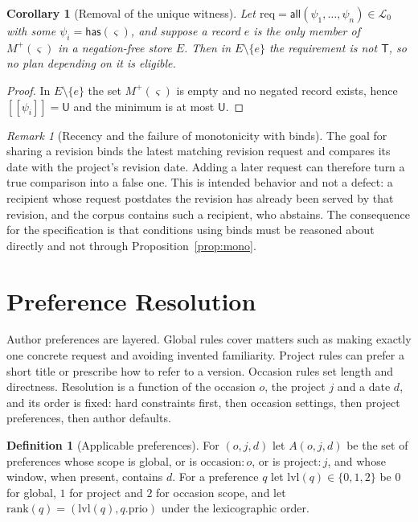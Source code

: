 \documentclass[11pt]{article}
\newtheorem{corollary}[theorem]{Corollary}
\theoremstyle{definition}
\newtheorem{definition}[theorem]{Definition}
\theoremstyle{remark}
\newtheorem{remark}[theorem]{Remark}
\newcommand{\vT}{\mathsf{T}}
\newcommand{\vU}{\mathsf{U}}
\newcommand{\sem}[1]{[\![#1]\!]}
\newcommand{\rank}{\mathrm{rank}}
\begin{document}
\begin{corollary}[Removal of the unique witness]\label{cor:removal}
Let $\mathrm{req}=\mathsf{all}(\psi_1,\dots,\psi_n)\in\mathcal{L}_0$ with some $\psi_i=\mathsf{has}(\varsigma)$, and suppose a record $e$ is the only member of $M^{+}(\varsigma)$ in a negation-free store $E$. Then in $E\setminus\{e\}$ the requirement is not $\vT$, so no plan depending on it is eligible.
\end{corollary}
\begin{proof}
In $E\setminus\{e\}$ the set $M^{+}(\varsigma)$ is empty and no negated record exists, hence $\sem{\psi_i}=\vU$ and the minimum is at most $\vU$.
\end{proof}

\begin{remark}[Recency and the failure of monotonicity with binds]\label{rem:bind}
The goal for sharing a revision binds the latest matching revision request and compares its date with the project's revision date. Adding a later request can therefore turn a true comparison into a false one. This is intended behavior and not a defect: a recipient whose request postdates the revision has already been served by that revision, and the corpus contains such a recipient, who abstains. The consequence for the specification is that conditions using binds must be reasoned about directly and not through Proposition~\ref{prop:mono}.
\end{remark}

\section{Preference Resolution}\label{sec:prefs}

Author preferences are layered. Global rules cover matters such as making exactly one concrete request and avoiding invented familiarity. Project rules can prefer a short title or prescribe how to refer to a version. Occasion rules set length and directness. Resolution is a function of the occasion $o$, the project $j$ and a date $d$, and its order is fixed: hard constraints first, then occasion settings, then project preferences, then author defaults.

\begin{definition}[Applicable preferences]
For $(o,j,d)$ let $A(o,j,d)$ be the set of preferences whose scope is global, or is $\text{occasion}{:}o$, or is $\text{project}{:}j$, and whose window, when present, contains $d$. For a preference $q$ let $\mathrm{lvl}(q)\in\{0,1,2\}$ be $0$ for global, $1$ for project and $2$ for occasion scope, and let $\rank(q)=(\mathrm{lvl}(q),q.\mathrm{prio})$ under the lexicographic order.
\end{definition}
\end{document}
